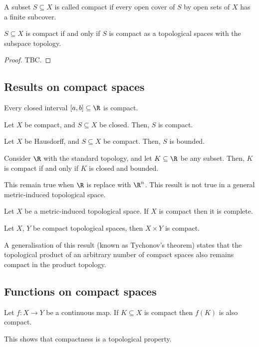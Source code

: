 \begin{ndfn}
  A subset $S \subseteq X$ is called compact if every open cover of $S$ by open sets of $X$ has a finite subcover.
\end{ndfn}

\begin{nlemma}
  $S \subseteq X$ is compact if and only if $S$ is compact as a topological spaces with the subspace topology.
\end{nlemma}
\begin{proof}
  TBC.
\end{proof}

\subsection{Results on compact spaces}
\begin{nthm}
  Every closed interval $[a,b] \subseteq \R$ is compact.
\end{nthm}

\begin{nthm}
  Let $X$ be compact, and $S \subseteq X$ be closed. Then, $S$ is compact.
\end{nthm}

\begin{nthm}
  Let $X$ be Hausdorff, and $S \subseteq X$ be compact. Then, $S$ is bounded.
\end{nthm}

\begin{nthm}
  Consider $\R$ with the standard topology, and let $K \subseteq \R$ be any subset. Then, $K$ is compact if and only if $K$ is closed and bounded.
\end{nthm}
This remain true when $\R$ is replace with $\R^n$. This result is not true in a general metric-induced topological space.

\begin{nthm}
  Let $X$ be a metric-induced topological space. If $X$ is compact then it is complete.
\end{nthm}

\begin{nthm}
  Let $X$, $Y$ be compact topological spaces, then $X \times Y$ is compact.
\end{nthm}

A generalisation of this result (known as Tychonov's theorem) states that the topological product of an arbitrary number of compact spaces also remains compact in the product topology.

\subsection{Functions on compact spaces}
\begin{nthm}
  Let $f: X \to Y$ be a continuous map. If $K \subseteq X$ is compact then $f(K)$ is also compact.
\end{nthm}
This shows that compactness is a topological property.

